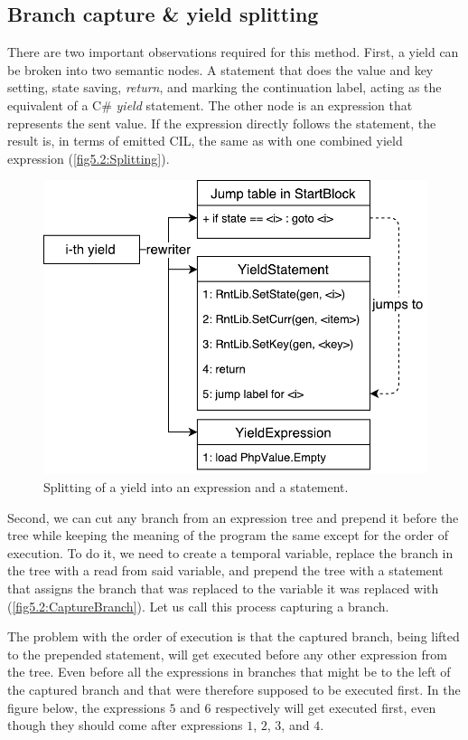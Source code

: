 \subsection{Branch capture \& yield splitting}

There are two important observations required for this method. First, a yield can be broken into two semantic nodes. A statement that does the value and key setting, state saving, \emph{return}, and marking the continuation label, acting as the equivalent of a C\# \emph{yield} statement. The other node is an expression that represents the sent value. If the expression directly follows the statement, the result is, in terms of emitted CIL, the same as with one combined yield expression (\autoref{fig5.2:Splitting}). 


\begin{figure}[h]
	\centering	
	\includegraphics[scale=0.75]{../img/5_2_yieldSplitting}	
	\caption{Splitting of a yield into an expression and a statement.}
	\label{fig5.2:Splitting}
\end{figure}

Second, we can cut any branch from an expression tree and prepend it before the tree while keeping the meaning of the program the same except for the order of execution. To do it, we need to create a temporal variable, replace the branch in the tree with a read from said variable, and prepend the tree with a statement that assigns the branch that was replaced to the variable it was replaced with (\autoref{fig5.2:CaptureBranch}). Let us call this process capturing a branch.

The problem with the order of execution is that the captured branch, being lifted to the prepended statement, will get executed before any other expression from the tree. Even before all the expressions in branches that might be to the left of the captured branch and that were therefore supposed to be executed first. In the figure below, the expressions $5$ and $6$ respectively will get executed first, even though they should come after expressions $1$, $2$, $3$, and $4$.


